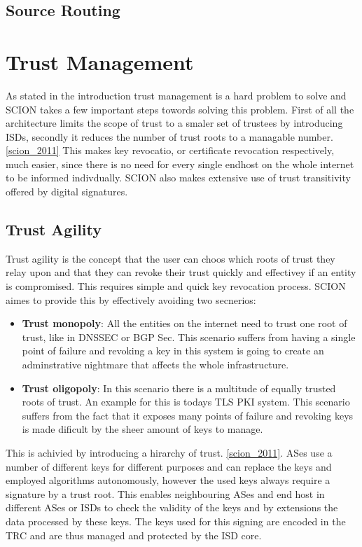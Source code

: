 \documentclass[../eva1_scion.tex]{subfiles}
\begin{document}
    \subsection{Source Routing}


    \section{Trust Management}
    As stated in the introduction trust management is a hard problem to solve and SCION takes a few important steps towords solving this problem. First of all the architecture limits the scope of trust to a smaler set of trustees by introducing ISDs, secondly it reduces the number of trust roots to a managable number. \ref{scion_2011} This makes key revocatio, or certificate revocation respectively, much easier, since there is no need for every single endhost on the whole internet to be informed indivdually. SCION also makes extensive use of trust transitivity offered by digital signatures.

    \subsection{Trust Agility}
    Trust agility is the concept that the user can choos which roots of trust they relay upon and that they can revoke their trust quickly and effectivey if an entity is compromised. This requires simple and quick key revocation process. SCION aimes to provide this by effectively avoiding two secnerios:

    \begin{itemize}
        \item \textbf{Trust monopoly}: All the entities on the internet need to trust one root of trust, like in DNSSEC or BGP Sec. This scenario suffers from having a single point of failure and revoking a key in this system is going to create an adminstrative nightmare that affects the whole infrastructure.
        \item  \textbf{Trust oligopoly}: In this scenario there is a multitude of equally trusted roots of trust. An example for this is todays TLS PKI system. This scenario suffers from the fact that it exposes many points of failure and revoking keys is made dificult by the sheer amount of keys to manage.
    \end{itemize}

    This is achivied by introducing a hirarchy of trust. \ref{scion_2011}. ASes use a number of different keys for different purposes and can replace the keys and employed algorithms autonomously, however the used keys always require a signature by a trust root. This enables neighbouring ASes and end host in different ASes or ISDs to check the validity of the keys and by extensions the data processed by these keys. The keys used for this signing are encoded in the TRC and are thus managed and protected by the ISD core.
\end{document}
